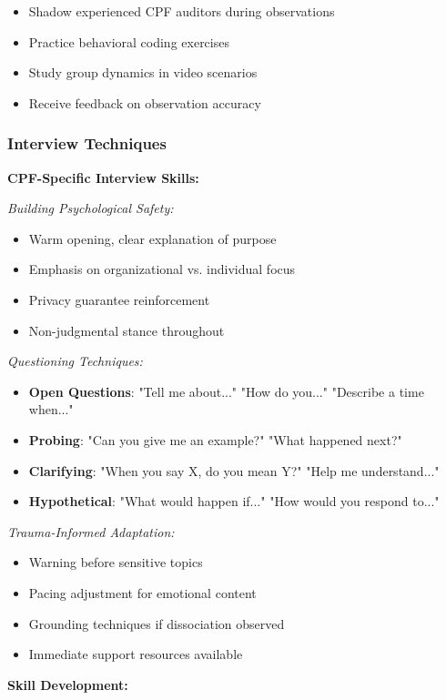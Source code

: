 \documentclass[11pt,a4paper]{article}
\begin{document}
\begin{itemize}
\item Shadow experienced CPF auditors during observations
\item Practice behavioral coding exercises
\item Study group dynamics in video scenarios
\item Receive feedback on observation accuracy
\end{itemize}

\subsubsection{Interview Techniques}

\textbf{CPF-Specific Interview Skills:}

\textit{Building Psychological Safety:}
\begin{itemize}
\item Warm opening, clear explanation of purpose
\item Emphasis on organizational vs. individual focus
\item Privacy guarantee reinforcement
\item Non-judgmental stance throughout
\end{itemize}

\textit{Questioning Techniques:}
\begin{itemize}
\item \textbf{Open Questions}: "Tell me about..." "How do you..." "Describe a time when..."
\item \textbf{Probing}: "Can you give me an example?" "What happened next?"
\item \textbf{Clarifying}: "When you say X, do you mean Y?" "Help me understand..."
\item \textbf{Hypothetical}: "What would happen if..." "How would you respond to..."
\end{itemize}

\textit{Trauma-Informed Adaptation:}
\begin{itemize}
\item Warning before sensitive topics
\item Pacing adjustment for emotional content
\item Grounding techniques if dissociation observed
\item Immediate support resources available
\end{itemize}

\textbf{Skill Development:}
\end{document}
